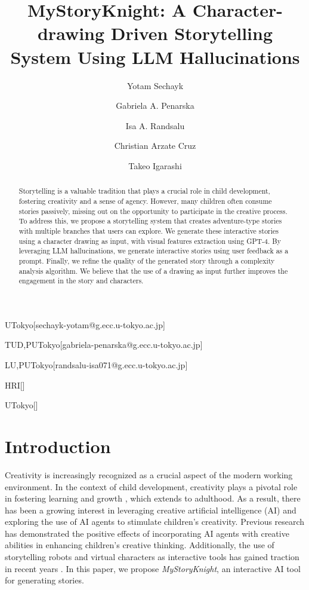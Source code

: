 \documentclass[submit,techrep,english]{ipsj}
\begin{document}
\title{MyStoryKnight: A Character-drawing Driven Storytelling System Using LLM Hallucinations}


\author{Yotam Sechayk}{UTokyo}[sechayk-yotam@g.ecc.u-tokyo.ac.jp]
\author{Gabriela A. Penarska}{TUD,PUTokyo}[gabriela-penarska@g.ecc.u-tokyo.ac.jp]
\author{Isa A. Randsalu}{LU,PUTokyo}[randsalu-isa071@g.ecc.u-tokyo.ac.jp]
\author{Christian Arzate Cruz}{HRI}[]

\author{Takeo Igarashi}{UTokyo}[]


\begin{abstract}
    Storytelling is a valuable tradition that plays a crucial role in child development, fostering creativity and a sense of agency. However, many children often consume stories passively, missing out on the opportunity to participate in the creative process. To address this, we propose a storytelling system that creates adventure-type stories with multiple branches that users can explore. We generate these interactive stories using a character drawing as input, with visual features extraction using GPT-4. By leveraging LLM hallucinations, we generate interactive stories using user feedback as a prompt. Finally, we refine the quality of the generated story through a complexity analysis algorithm. We believe that the use of a drawing as input further improves the engagement in the story and characters.
\end{abstract}

\maketitle

\section{Introduction}
\label{sec:introduction}
Creativity is increasingly recognized as a crucial aspect of the modern working environment. In the context of child development, creativity plays a pivotal role in fostering learning and growth \cite{1:ElgarfP22}, which extends to adulthood. As a result, there has been a growing interest in leveraging creative artificial intelligence (AI) and exploring the use of AI agents to stimulate children's creativity. Previous research has demonstrated the positive effects of incorporating AI agents with creative abilities in enhancing children's creative thinking. Additionally, the use of storytelling robots and virtual characters as interactive tools has gained traction in recent years \cite{7:SunLLL17}. In this paper, we propose \textit{MyStoryKnight}, an interactive AI tool for generating stories.
\end{document}
